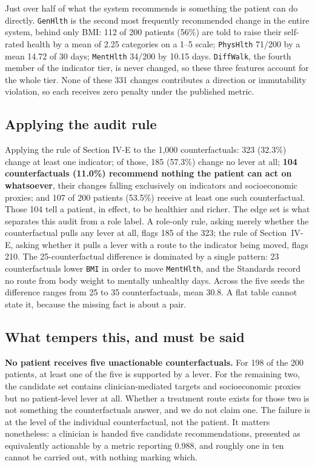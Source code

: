 \documentclass[conference]{IEEEtran}
\begin{document}
Just over half of what the system recommends is something the patient can do directly. \texttt{GenHlth} is the second most frequently recommended change in the entire system, behind only BMI: 112 of 200 patients (56\%) are told to raise their self-rated health by a mean of 2.25 categories on a 1--5 scale; \texttt{PhysHlth} 71/200 by a mean 14.72 of 30 days; \texttt{MentHlth} 34/200 by 10.15 days. \texttt{DiffWalk}, the fourth member of the indicator tier, is never changed, so these three features account for the whole tier. None of these 331 changes contributes a direction or immutability violation, so each receives zero penalty under the published metric.

\subsection{Applying the audit rule}
Applying the rule of Section IV-E to the 1{,}000 counterfactuals: 323 (32.3\%) change at least one indicator; of those, 185 (57.3\%) change no lever at all; \textbf{104 counterfactuals (11.0\%) recommend nothing the patient can act on whatsoever}, their changes falling exclusively on indicators and socioeconomic proxies; and 107 of 200 patients (53.5\%) receive at least one such counterfactual. Those 104 tell a patient, in effect, to be healthier and richer. The edge set is what separates this audit from a role label. A role-only rule, asking merely whether the counterfactual pulls any lever at all, flags 185 of the 323; the rule of Section~IV-E, asking whether it pulls a lever with a route to the indicator being moved, flags 210. The 25-counterfactual difference is dominated by a single pattern: 23 counterfactuals lower \texttt{BMI} in order to move \texttt{MentHlth}, and the Standards record no route from body weight to mentally unhealthy days. Across the five seeds the difference ranges from 25 to 35 counterfactuals, mean 30.8. A flat table cannot state it, because the missing fact is about a pair.

\subsection{What tempers this, and must be said}
\textbf{No patient receives five unactionable counterfactuals.} For 198 of the 200 patients, at least one of the five is supported by a lever. For the remaining two, the candidate set contains clinician-mediated targets and socioeconomic proxies but no patient-level lever at all. Whether a treatment route exists for those two is not something the counterfactuals answer, and we do not claim one. The failure is at the level of the individual counterfactual, not the patient. It matters nonetheless: a clinician is handed five candidate recommendations, presented as equivalently actionable by a metric reporting 0.988, and roughly one in ten cannot be carried out, with nothing marking which.
\end{document}
